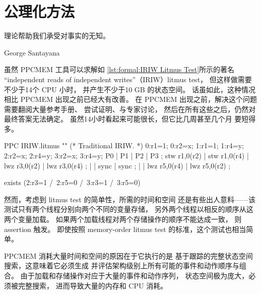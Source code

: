 
\section{公理化方法}
\label{sec:formal:Axiomatic Approaches}
%
\epigraph{理论帮助我们承受对事实的无知。}
	{George Santayana}

虽然 PPCMEM 工具可以求解如
\cref{lst:formal:IRIW Litmus Test}所示的著名
``independent reads of independent writes''（IRIW）litmus test，
但这样做需要不少于14个 CPU 小时，
并产生不少于10 GB 的状态空间。
话虽如此，这种情况相比 PPCMEM 出现之前已经大有改善。
在 PPCMEM 出现之前，解决这个问题需要翻阅大量参考手册、
尝试证明、与专家讨论，
然后在所有这些之后，仍然对最终答案无法确定。
虽然14小时看起来可能很长，但它比几周甚至几个月
要短得多。

\begin{listing}
\begin{fcvlabel}
\begin{VerbatimL}[commandchars=\%\@\$]
PPC IRIW.litmus
""
(* Traditional IRIW. *)
{
0:r1=1; 0:r2=x;
1:r1=1;         1:r4=y;
        2:r2=x; 2:r4=y;
        3:r2=x; 3:r4=y;
}
P0           | P1           | P2           | P3           ;
stw r1,0(r2) | stw r1,0(r4) | lwz r3,0(r2) | lwz r3,0(r4) ;
             |              | sync         | sync         ;
             |              | lwz r5,0(r4) | lwz r5,0(r2) ;

exists
(2:r3=1 /\ 2:r5=0 /\ 3:r3=1 /\ 3:r5=0)
\end{VerbatimL}
\end{fcvlabel}
\caption{IRIW 石蕊测试}
\label{lst:formal:IRIW Litmus Test}
\end{listing}

然而，考虑到 litmus test 的简单性，所需的时间和空间
还是有些出人意料——该测试只有两个线程分别向两个不同的变量存储，
另外两个线程以相反的顺序从这两个变量加载。
如果两个加载线程对两个存储操作的顺序不能达成一致，
则 assertion 触发。
即使按照 memory-order litmus test 的标准，这个测试也相当简单。

PPCMEM 消耗大量时间和空间的原因在于它执行的是
基于跟踪的完整状态空间搜索，这意味着它必须生成
并评估架构级别上所有可能的事件和动作顺序与组合。
由于加载和存储操作对应于大量的事件和动作序列，
状态空间极为庞大，必须被完整搜索，
进而导致大量的内存和 CPU 消耗。

